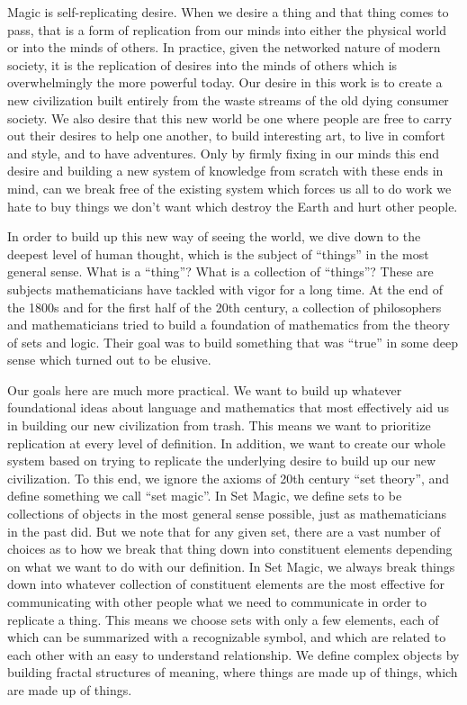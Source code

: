
Magic is self-replicating desire.  When we desire a thing and that thing comes to pass, that is a form of replication from our minds into either the physical world or into the minds of others.  In practice, given the networked nature of modern society, it is the replication of desires into the minds of others which is overwhelmingly the more powerful today.  Our desire in this work is to create a new civilization built entirely from the waste streams of the old dying consumer society.  We also desire that this new world be one where people are free to carry out their desires to help one another, to build interesting art, to live in comfort and style, and to have adventures.  Only by firmly fixing in our minds this end desire and building a new system of knowledge from scratch with these ends in mind, can we break free of the existing system which forces us all to do work we hate to buy things we don't want which destroy the Earth and hurt other people. 

In order to build up this new way of seeing the world, we dive down to the deepest level of human thought, which is the subject of ``things'' in the most general sense.  What is a ``thing''? What is a collection of ``things''?  These are subjects mathematicians have tackled with vigor for a long time.  At the end of the 1800s and for the first half of the 20th century,  a collection of philosophers and mathematicians tried to build a foundation of mathematics from the theory of sets and logic.  Their goal was to build something that was ``true'' in some deep sense which turned out to be elusive.  

Our goals here are much more practical.  We want to build up whatever foundational ideas about language and mathematics that most effectively aid us in building our new civilization from trash.  This means we want to prioritize replication at every level of definition.  In addition, we want to create our whole system based on trying to replicate the underlying desire to build up our new civilization.  To this end, we ignore the axioms of 20th century ``set theory'', and define something we call ``set magic''.  In Set Magic, we define sets to be collections of objects in the most general sense possible, just as mathematicians in the past did.  But we note that for any given set, there are a vast number of choices as to how we break that thing down into constituent elements depending on what we want to do with our definition.  In Set Magic, we always break things down into whatever collection of constituent elements are the most effective for communicating with other people what we need to communicate in order to replicate a thing.  This means we choose sets with only a few elements, each of which can be summarized with a recognizable symbol, and which are related to each other with an easy to understand relationship.  We define complex objects by building fractal structures of meaning, where things are made up of things, which are made up of things.  

